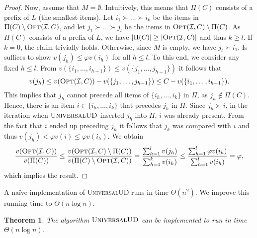 \documentclass[11pt]{article}
\newcommand{\noun}[1]{\textsc{#1}}
\newtheorem{theorem}{Theorem}
\newcommand{\opt}{\textsc{Opt}}
\newcommand{\OPT}{\opt}
\newcommand{\I}{\mathcal{I}}
\begin{document}
\begin{proof}
Now, assume that $M=\emptyset$. Intuitively, this means that $\Pi(C)$
consists of a prefix of $L$ (the smallest items). Let $i_{1}\succ\dots\succ i_{k}$
be the items in $\Pi(C)\setminus\OPT(\I,C)$, and let $j_{1}\succ\dots\succ j_{l}$
be the items in $\OPT(\I,C)\setminus\Pi(C)$. As $\Pi(C)$ consists
of a prefix of $L$, we have $|\Pi(C)|\geq|\OPT(\I,C)|$ and thus
$k\geq l$. If $k=0$, the claim trivially holds. Otherwise, since
$M$ is empty, we have $j_{l}\succ i_{1}$. Is suffices to show $v(j_{h})\leq\varphi v(i_{h})$
for all $h\leq l$. To this end, we consider any fixed $h\leq l$.
From $v(\{i_{1},\dots,i_{h-1}\})\leq v(\{j_{1},\dots,j_{h-1}\})$
it follows that
\[
v(j_{h})\leq v(\OPT(\I,C))-v(\{j_{1},\dots,j_{h-1}\})\leq C-v(\{i_{1},\dots,i_{h-1}\}).
\]
 This implies that $j_{h}$ cannot precede all items of $\{i_{h},\dots,i_{k}\}$
in $\Pi$, as $j_{h}\notin\Pi(C)$. Hence, there is an item $i\in\{i_{h},\dots,i_{k}\}$
that precedes $j_{h}$ in $\Pi$. Since $j_{h}\succ i$, in the iteration
when $\textsc{UniversalUD}$ inserted $j_{h}$ into $\Pi$, $i$ was
already present. From the fact that $i$ ended up preceding $j_{h}$
it follows that $j_{k}$ was compared with $i$ and thus $v(j_{h})<\varphi v(i)\leq\varphi v(i_{h})$.
We obtain
\[
\frac{v(\OPT(\I,C))}{v(\Pi(C))}\leq\frac{v(\OPT(\I,C)\setminus\Pi(C))}{v(\Pi(C)\setminus\OPT(\I,C))}=\frac{\sum_{h=1}^{l}
v(j_{h})}{\sum_{h=1}^{k}v(i_{h})}\leq\frac{\sum_{h=1}^{l}\varphi v(i_{h})}{\sum_{h=1}^{l}v(i_{h})}=\varphi,
\]
{which implies the result.}
\end{proof}
A naïve implementation of \noun{UniversalUD }runs in time $\Theta(n^{2})$.
We improve this running time to $\Theta(n\log n)$. 
\begin{theorem}
The algorithm $\textsc{UniversalUD}$ can be implemented to run in
time $\Theta(n\log n)$. \label{thm:running time UniversalUD}\end{theorem}
\end{document}
